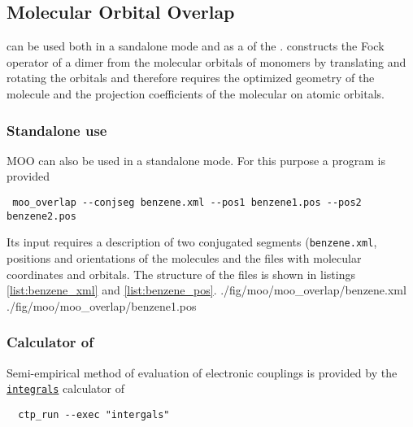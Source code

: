 \newcommand{\integrals}{\hyperref[calc:integrals]{\texttt{integrals}}\xspace}

\subsection{Molecular Orbital Overlap}

\moo can be used both in a sandalone mode and as a \calculator of the \votcact. \moo constructs the Fock operator of a dimer from the  molecular orbitals of monomers by translating and rotating the orbitals and therefore requires the optimized geometry of the molecule and the projection coefficients of the molecular on atomic orbitals. 


\subsubsection{Standalone use}
MOO can also be used in a standalone mode. For this purpose a program \overlap is provided 
\begin{verbatim}
 moo_overlap --conjseg benzene.xml --pos1 benzene1.pos --pos2 benzene2.pos
\end{verbatim}
Its input requires a description of two conjugated segments (\texttt{benzene.xml}, positions and orientations of the molecules and the files with molecular coordinates and orbitals. The structure of the files is shown in listings \ref{list:benzene_xml} and  \ref{list:benzene_pos}.
\vskip 0.1cm
 {./fig/moo/moo_overlap/benzene.xml}
\vskip 0.1cm
 {./fig/moo/moo_overlap/benzene1.pos}


\subsubsection{Calculator of \votcact}
Semi-empirical method of evaluation of electronic couplings is provided by the \integrals calculator of  \ctprun
\begin{verbatim}
  ctp_run --exec "intergals"
\end{verbatim}


